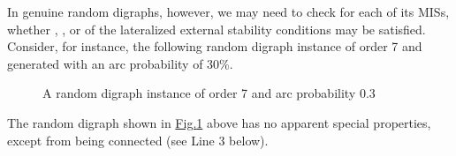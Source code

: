 \documentclass[a4paper,12pt,english]{sphinxhowto}
\let\sphinxpxdimen\pdfpxdimen\else\newdimen\sphinxpxdimen
\begin{document}
\sphinxAtStartPar
In genuine random digraphs, however, we may need to check for each of its MISs, whether , , or  of the lateralized external stability conditions may be satisfied. Consider, for instance, the following random digraph instance of order 7 and generated with an arc probability of 30\%.

\begin{sphinxVerbatim}[commandchars=\\\{\},numbers=left,firstnumber=1,stepnumber=1]
   
  
\end{sphinxVerbatim}

\begin{figure}[H]
\centering
\capstart

\noindent\sphinxincludegraphics[width=300\sphinxpxdimen]{{randomLaterality}.png}
\caption{A random digraph instance of order 7 and arc probability 0.3}\label{\detokenize{pearls:randomlaterality}}\end{figure}

\sphinxAtStartPar
The random digraph shown in \hyperref[\detokenize{pearls:randomlaterality}]{Fig.\@ \ref{\detokenize{pearls:randomlaterality}}} above has no apparent special properties, except from being connected (see Line 3 below).
\end{document}
